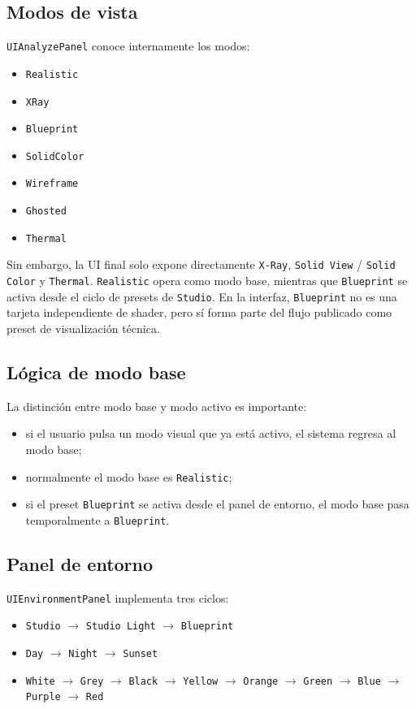 \documentclass[12pt,letterpaper]{article}
\begin{document}
\subsection{Modos de vista}
\texttt{UIAnalyzePanel} conoce internamente los modos:
\begin{itemize}
    \item \texttt{Realistic}
    \item \texttt{XRay}
    \item \texttt{Blueprint}
    \item \texttt{SolidColor}
    \item \texttt{Wireframe}
    \item \texttt{Ghosted}
    \item \texttt{Thermal}
\end{itemize}

\noindent Sin embargo, la UI final solo expone directamente \texttt{X-Ray}, \texttt{Solid View} / \texttt{Solid Color} y \texttt{Thermal}. \texttt{Realistic} opera como modo base, mientras que \texttt{Blueprint} se activa desde el ciclo de presets de \texttt{Studio}. En la interfaz, \texttt{Blueprint} no es una tarjeta independiente de shader, pero sí forma parte del flujo publicado como preset de visualización técnica.

\subsection{Lógica de modo base}
La distinción entre modo base y modo activo es importante:
\begin{itemize}
    \item si el usuario pulsa un modo visual que ya está activo, el sistema regresa al modo base;
    \item normalmente el modo base es \texttt{Realistic};
    \item si el preset \texttt{Blueprint} se activa desde el panel de entorno, el modo base pasa temporalmente a \texttt{Blueprint}.
\end{itemize}

\subsection{Panel de entorno}
\texttt{UIEnvironmentPanel} implementa tres ciclos:
\begin{itemize}
    \item \texttt{Studio} $\rightarrow$ \texttt{Studio Light} $\rightarrow$ \texttt{Blueprint}
    \item \texttt{Day} $\rightarrow$ \texttt{Night} $\rightarrow$ \texttt{Sunset}
    \item \texttt{White} $\rightarrow$ \texttt{Grey} $\rightarrow$ \texttt{Black} $\rightarrow$ \texttt{Yellow} $\rightarrow$ \texttt{Orange} $\rightarrow$ \texttt{Green} $\rightarrow$ \texttt{Blue} $\rightarrow$ \texttt{Purple} $\rightarrow$ \texttt{Red}
\end{itemize}
\end{document}
